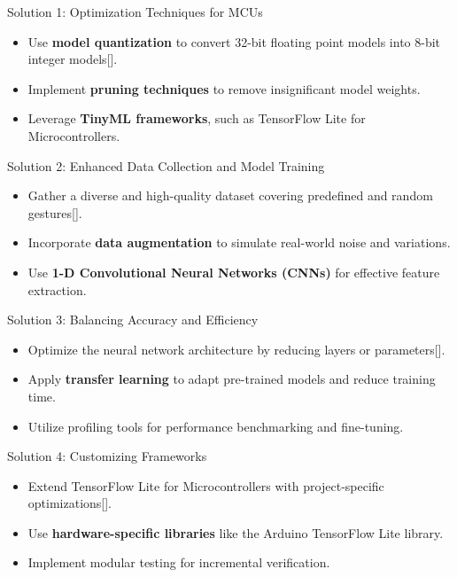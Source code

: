 %
%
%

\begin{frame}{Solution 1: Optimization Techniques for MCUs}
	\begin{itemize}
		\item Use \textbf{model quantization} to convert 32-bit floating point models into 8-bit integer models[\cite{Ard:2021}].
		\item Implement \textbf{pruning techniques} to remove insignificant model weights.
		\item Leverage \textbf{TinyML frameworks}, such as TensorFlow Lite for Microcontrollers.
	\end{itemize}
\end{frame}


\begin{frame}{Solution 2: Enhanced Data Collection and Model Training}
	\begin{itemize}
		\item Gather a diverse and high-quality dataset covering predefined and random gestures[\cite{shi:2016}].
		\item Incorporate \textbf{data augmentation} to simulate real-world noise and variations.
		\item Use \textbf{1-D Convolutional Neural Networks (CNNs)} for effective feature extraction.
	\end{itemize}
\end{frame}


\begin{frame}{Solution 3: Balancing Accuracy and Efficiency}
	\begin{itemize}
		\item Optimize the neural network architecture by reducing layers or parameters[\cite{shi:2016}].
		\item Apply \textbf{transfer learning} to adapt pre-trained models and reduce training time.
		\item Utilize profiling tools for performance benchmarking and fine-tuning.
	\end{itemize}
\end{frame}


\begin{frame}{Solution 4: Customizing Frameworks}
	\begin{itemize}
		\item Extend TensorFlow Lite for Microcontrollers with project-specific optimizations[\cite{War:2020}].
		\item Use \textbf{hardware-specific libraries} like the Arduino TensorFlow Lite library.
		\item Implement modular testing for incremental verification.
	\end{itemize}
\end{frame}

